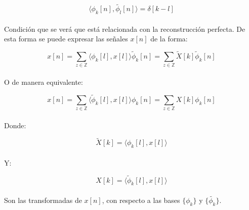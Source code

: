\begin{equation}
	\langle \phi_k[n] , \tilde{\phi_l}[n] \rangle = \delta[k - l]
	\label{eq:biortcond}
\end{equation}

\paragraph{}
Condición que se verá que está relacionada con la reconstrucción perfecta. De esta forma se puede expresar las señales $x[n]$ de la forma:

\begin{equation}
	x[n] = \sum_{z \in \mathbb{Z}} \langle \phi_k[l] , x[l] \rangle \tilde{\phi}_{k}[n] = \sum_{z \in \mathbb{Z}} \tilde{X}[k] \tilde{\phi}_{k}[n]
\end{equation}

\paragraph{}
O de manera equivalente:

\begin{equation}
	x[n] = \sum_{z \in \mathbb{Z}} \langle \tilde{\phi}_k[l] , x[l] \rangle \phi_{k}[n] = \sum_{z \in \mathbb{Z}} X[k] \phi_{k}[n]
\end{equation}

\paragraph{}
Donde:

\begin{equation}
	\tilde{X}[k] = \langle \phi_k[l] , x[l] \rangle
\end{equation}

\paragraph{}
Y:

\begin{equation}
	X[k] = \langle \tilde{\phi}_k[l] , x[l] \rangle
\end{equation}

\paragraph{}
Son las transformadas de $x[n]$, con respecto a las bases $\{ \phi_{k} \}$ y $\{ \tilde{\phi_{k}} \}$.
